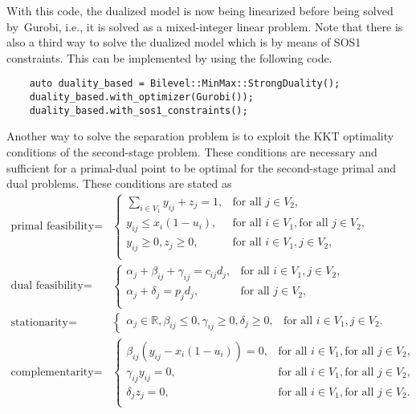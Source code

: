 With this code, the dualized model is now being linearized before being solved
by~\textsf{Gurobi}, i.e., it is solved as a mixed-integer linear problem. Note
that there is also a third way to solve the dualized model which is by means
of SOS1 constraints. This can be implemented by using the following code. 
%
\begin{lstlisting}
    auto duality_based = Bilevel::MinMax::StrongDuality();
    duality_based.with_optimizer(Gurobi());
    duality_based.with_sos1_constraints();
\end{lstlisting} 

Another way to solve the separation problem is to exploit the KKT optimality
conditions of the second-stage problem. These conditions are necessary and
sufficient for a primal-dual point to be optimal for the second-stage primal
and dual problems. These conditions are stated as 
\begin{equation}
    \label{eq:ccg:uflp:kkt}
    \begin{aligned}
        \text{primal feasibility} = & 
        \begin{cases}
            \sum_{i\in V_1} y_{ij} + z_j = 1, & \text{for all } j\in V_2, \\
            y_{ij} \le x_i(1 - u_i), & \text{for all } i\in V_1, \text{for all } j\in V_2,  \\
            y_{ij}\ge 0, z_j \ge 0, & \text{for all } i\in V_1, j\in V_2, \\
        \end{cases} \\
        \text{dual feasibility} = & 
        \begin{cases}
            \alpha_j + \beta_{ij} + \gamma_{ij} = c_{ij}d_j, & \text{for all }i\in V_1, j\in V_2, \\
            \alpha_j + \delta_j = p_jd_j, & \text{for all } j\in V_2, \\
        \end{cases} \\
        \text{stationarity} = &
        \begin{cases}
            \alpha_j\in\mathbb{R}, \beta_{ij} \le 0, \gamma_{ij} \ge 0, \delta_j \ge 0, & \text{for all } i\in V_1, j\in V_2.
        \end{cases} \\
        \text{complementarity} = & 
        \begin{cases}
            \beta_{ij}(y_{ij} - x_i(1 - u_i)) = 0, & \text{for all } i\in V_1, \text{for all } j\in V_2, \\
            \gamma_{ij}y_{ij} = 0, & \text{for all } i\in V_1, \text{for all } j\in V_2, \\
            \delta_jz_j = 0, & \text{for all } i\in V_1, \text{for all } j\in V_2. \\
        \end{cases}
    \end{aligned}
\end{equation}
